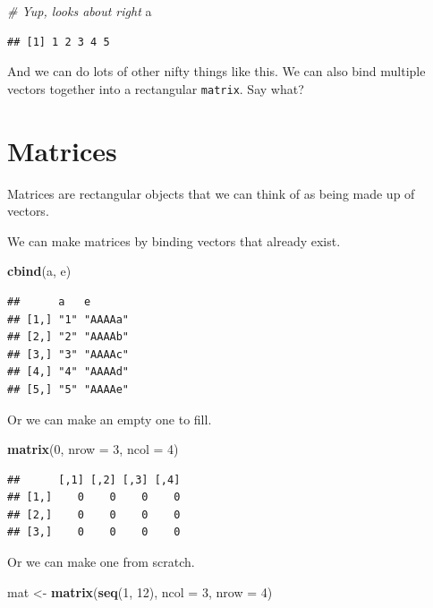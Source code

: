 \documentclass[
]{book}
\newenvironment{Shaded}{\begin{snugshade}}{\end{snugshade}}
\newcommand{\CommentTok}[1]{\textcolor[rgb]{0.56,0.35,0.01}{\textit{#1}}}
\newcommand{\DataTypeTok}[1]{\textcolor[rgb]{0.13,0.29,0.53}{#1}}
\newcommand{\DecValTok}[1]{\textcolor[rgb]{0.00,0.00,0.81}{#1}}
\newcommand{\KeywordTok}[1]{\textcolor[rgb]{0.13,0.29,0.53}{\textbf{#1}}}
\newcommand{\NormalTok}[1]{#1}
\newcommand{\StringTok}[1]{\textcolor[rgb]{0.31,0.60,0.02}{#1}}
\begin{document}
\begin{Shaded}
\begin{Highlighting}[]
\CommentTok{# Yup, looks about right}
\NormalTok{a}
\end{Highlighting}
\end{Shaded}

\begin{verbatim}
## [1] 1 2 3 4 5
\end{verbatim}

And we can do lots of other nifty things like this. We can also bind multiple vectors together into a rectangular \texttt{matrix}. Say what?

\hypertarget{matrices}{%
\section{Matrices}\label{matrices}}

Matrices are rectangular objects that we can think of as being made up of vectors.

We can make matrices by binding vectors that already exist.

\begin{Shaded}
\begin{Highlighting}[]
\KeywordTok{cbind}\NormalTok{(a, e)}
\end{Highlighting}
\end{Shaded}

\begin{verbatim}
##      a   e      
## [1,] "1" "AAAAa"
## [2,] "2" "AAAAb"
## [3,] "3" "AAAAc"
## [4,] "4" "AAAAd"
## [5,] "5" "AAAAe"
\end{verbatim}

Or we can make an empty one to fill.

\begin{Shaded}
\begin{Highlighting}[]
\KeywordTok{matrix}\NormalTok{(}\DecValTok{0}\NormalTok{, }\DataTypeTok{nrow =} \DecValTok{3}\NormalTok{, }\DataTypeTok{ncol =} \DecValTok{4}\NormalTok{)}
\end{Highlighting}
\end{Shaded}

\begin{verbatim}
##      [,1] [,2] [,3] [,4]
## [1,]    0    0    0    0
## [2,]    0    0    0    0
## [3,]    0    0    0    0
\end{verbatim}

Or we can make one from scratch.

\begin{Shaded}
\begin{Highlighting}[]
\NormalTok{mat <-}\StringTok{ }\KeywordTok{matrix}\NormalTok{(}\KeywordTok{seq}\NormalTok{(}\DecValTok{1}\NormalTok{, }\DecValTok{12}\NormalTok{), }\DataTypeTok{ncol =} \DecValTok{3}\NormalTok{, }\DataTypeTok{nrow =} \DecValTok{4}\NormalTok{)}
\end{Highlighting}
\end{Shaded}
\end{document}
